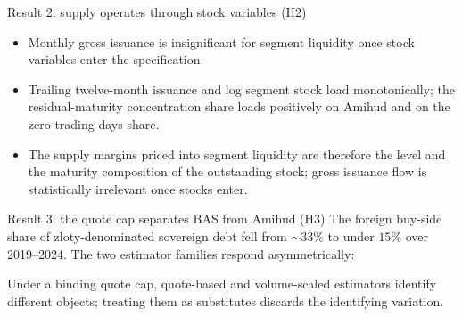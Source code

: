 \documentclass[aspectratio=169,11pt]{beamer}
\begin{document}
\begin{frame}{Result 2: supply operates through stock variables (H2)}
  \begin{itemize}
    \item Monthly gross issuance is insignificant for segment liquidity once
          stock variables enter the specification.
    \item Trailing twelve-month issuance and log segment stock load
          monotonically; the residual-maturity concentration share loads
          positively on Amihud and on the zero-trading-days share.
    \item The supply margins priced into segment liquidity are therefore the
          level and the maturity composition of the outstanding stock; gross
          issuance flow is statistically irrelevant once stocks enter.
  \end{itemize}
\end{frame}

\begin{frame}{Result 3: the quote cap separates BAS from Amihud (H3)}
  \small The foreign buy-side share of zloty-denominated sovereign debt fell
  from ${\sim}33\%$ to under $15\%$ over 2019--2024. The two estimator families
  respond asymmetrically:
  \vspace{3mm}
  \begin{center}
  \end{center}
  \vspace{1mm}
  \small\color{ycmuted} Under a binding quote cap, quote-based and volume-scaled
  estimators identify different objects; treating them as substitutes discards
  the identifying variation.
\end{frame}
\end{document}
